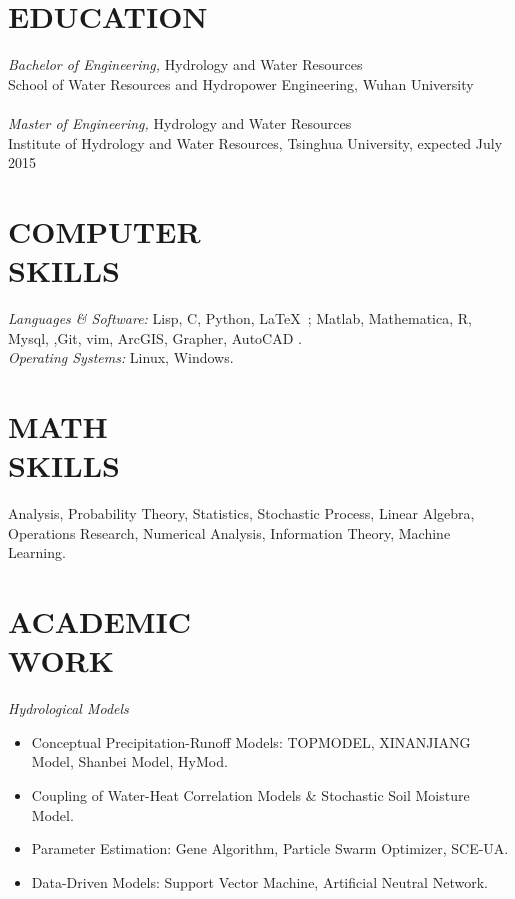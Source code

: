 \documentclass[margin]{res}
\begin{document}
\begin{resume}
\section{EDUCATION} {\sl Bachelor of Engineering,} Hydrology and Water Resources \\
                School of Water Resources and Hydropower Engineering, Wuhan University\\ 
                \\
                {\sl Master of Engineering,} Hydrology and Water Resources \\
                Institute of Hydrology and Water Resources, Tsinghua University, expected July 2015 \\
 
\section{COMPUTER \\ SKILLS} {\sl Languages \& Software:} Lisp, C, Python, \LaTeX\ ; Matlab, Mathematica, R,  Mysql,  ,Git, vim, ArcGIS, Grapher, AutoCAD .\\
                {\sl Operating Systems:} Linux, Windows.\\                             
\section{MATH \\ SKILLS}  Analysis,
 Probability Theory, Statistics,
 Stochastic Process, Linear Algebra, Operations Research, Numerical Analysis, Information Theory, Machine Learning.
            

\section{ACADEMIC\\WORK} {\sl Hydrological Models}   \\
                 \begin{itemize}  \itemsep -2pt %
                 \item Conceptual Precipitation-Runoff Models: TOPMODEL, XINANJIANG Model, Shanbei Model, HyMod.
                \item Coupling of Water-Heat Correlation Models \& Stochastic Soil Moisture Model.
                \item  Parameter Estimation: Gene Algorithm, Particle Swarm Optimizer, SCE-UA. 
                \item Data-Driven Models: Support Vector Machine, Artificial Neutral Network.
                \end{itemize}
 

\end{resume}
\end{document}
